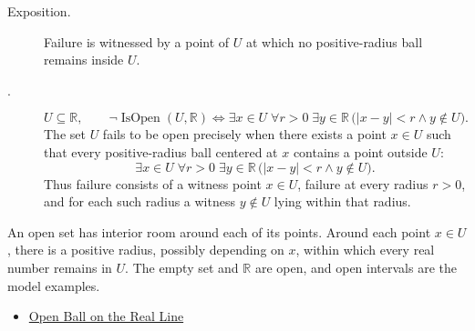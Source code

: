 \begin{remark*}
\begin{description}
  \item[Exposition.]
  Failure is witnessed by a point of $U$ at which no positive-radius ball
  remains inside $U$.

  \item[.]
  \[
  U\subseteq\mathbb{R},\qquad
  \neg\operatorname{IsOpen}(U,\mathbb{R})
  \Longleftrightarrow
  \exists x\in U\;\forall r>0\;\exists y\in\mathbb{R}\,
  \bigl(|x-y|<r\land y\notin U\bigr).
  \]
  The set $U$ fails to be open precisely when there exists a point $x\in U$
  such that every positive-radius ball centered at $x$ contains a point outside
  $U$:
\[
\exists x\in U\;\forall r>0\;\exists y\in\mathbb{R}\,
\bigl(|x-y|<r\land y\notin U\bigr).
\]
  Thus failure consists of a witness point $x\in U$, failure at every radius
  $r>0$, and for each such radius a witness $y\notin U$ lying within that
  radius.
\end{description}
\end{remark*}
\begin{remark*}[Interpretation]
An open set has interior room around each of its points. Around each point
$x\in U$, there is a positive radius, possibly depending on $x$, within which
every real number remains in $U$. The empty set and $\mathbb{R}$ are open, and
open intervals are the model examples.
\end{remark*}
\begin{dependencies}
\begin{itemize}
  \item \hyperref[def:open-ball]{Open Ball on the Real Line}
\end{itemize}
\end{dependencies}
